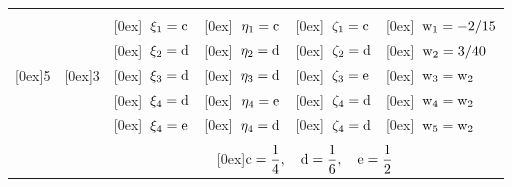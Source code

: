 \begin{table}
\begin{center}
\begin{tabular}{|c|c|l|l|l|l|}
                                                               &                                         &                                                             &                                                               &                                                               &                                                           \\
                                                               &                                         & \raisebox{0.3cm}[0ex]{$\;\;\rm \xi_1 = c                   $} & \raisebox{0.3cm}[0ex]{$\;\;\rm \eta_1 = c         $}             & \raisebox{0.3cm}[0ex]{$\;\;\rm  \zeta_1 = c         $}            & \raisebox{0.3cm}[0ex]{$\;\;\rm w_1 = -2/15          $}    \\
                                                               &                                         & \raisebox{0.3cm}[0ex]{$\;\;\rm \xi_2 = d                   $} & \raisebox{0.3cm}[0ex]{$\;\;\rm \eta_2 = d         $}             & \raisebox{0.3cm}[0ex]{$\;\;\rm  \zeta_2 = d         $}            & \raisebox{0.3cm}[0ex]{$\;\;\rm w_2 = 3/40           $}    \\
\raisebox{0.3cm}[0ex]{5}                                       & \raisebox{0.3cm}[0ex]{3}                & \raisebox{0.3cm}[0ex]{$\;\;\rm \xi_3 = d                   $} & \raisebox{0.3cm}[0ex]{$\;\;\rm \eta_3 = d         $}             & \raisebox{0.3cm}[0ex]{$\;\;\rm  \zeta_3 = e         $}            & \raisebox{0.3cm}[0ex]{$\;\;\rm w_3 = w_2            $}    \\
                                                               &                                         & \raisebox{0.3cm}[0ex]{$\;\;\rm \xi_4 = d                   $} & \raisebox{0.3cm}[0ex]{$\;\;\rm \eta_4 = e         $}             & \raisebox{0.3cm}[0ex]{$\;\;\rm  \zeta_4 = d         $}            & \raisebox{0.3cm}[0ex]{$\;\;\rm w_4 = w_2            $}    \\
                                                               &                                         & \raisebox{0.3cm}[0ex]{$\;\;\rm \xi_4 = e                   $} & \raisebox{0.3cm}[0ex]{$\;\;\rm \eta_4 = d         $}             & \raisebox{0.3cm}[0ex]{$\;\;\rm  \zeta_4 = d         $}            & \raisebox{0.3cm}[0ex]{$\;\;\rm w_5 = w_2            $}    \\
\cline{3-6} 
                                                               &                                         & \multicolumn{4}{c|}{}                                                                                                                                                               \\
                                                               &                                         & \multicolumn{4}{c|}{\raisebox{0.3cm}[0ex]{$\rm c = \dfrac{1}{4}, \quad d = \dfrac{1}{6}, \quad e = \dfrac{1}{2}$}}                                                                                                                                                               \\


\end{tabular}
\end{center}
\end{table}
